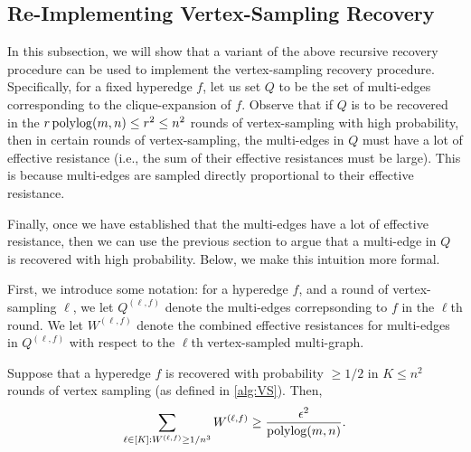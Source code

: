 \documentclass{article}
\begin{document}
\subsection{Re-Implementing Vertex-Sampling Recovery}

In this subsection, we will show that a variant of the above recursive recovery procedure can be used to implement the vertex-sampling recovery procedure. Specifically, for a fixed hyperedge $f$, let us set $Q$ to be the set of multi-edges corresponding to the clique-expansion of $f$. Observe that if $Q$ is to be recovered in the $r \operatorname{polylog}(m,n) \leq r^2 \leq n^2$ rounds of vertex-sampling with high probability, then in certain rounds of vertex-sampling, the multi-edges in $Q$ must have a lot of effective resistance (i.e., the sum of their effective resistances must be large). This is because multi-edges are sampled directly proportional to their effective resistance.

Finally, once we have established that the multi-edges have a lot of effective resistance, then we can use the previous section to argue that a multi-edge in $Q$ is recovered with high probability. Below, we make this intuition more formal. 

First, we introduce some notation: for a hyperedge $f$, and a round of vertex-sampling $\ell$, we let $Q^{(\ell, f)}$ denote the multi-edges correpsonding to $f$ in the $\ell$th round. We let $W^{(\ell, f)}$ denote the combined effective resistances for multi-edges in $Q^{(\ell, f)}$ with respect to the $\ell$th vertex-sampled multi-graph. 

\begin{claim}\label{clm:largeERSums}
    Suppose that a hyperedge $f$ is recovered with probability $\geq 1/2$ in $K \leq n^2$ rounds of vertex sampling (as defined in \cref{alg:VS}). Then, \[
    \sum_{\ell \in [K]: W^{(\ell, f)} \geq 1 / n^3} W^{(\ell, f)} \geq \frac{\epsilon^2}{\operatorname{polylog}(m,n)}.
    \]
\end{claim}
\end{document}
